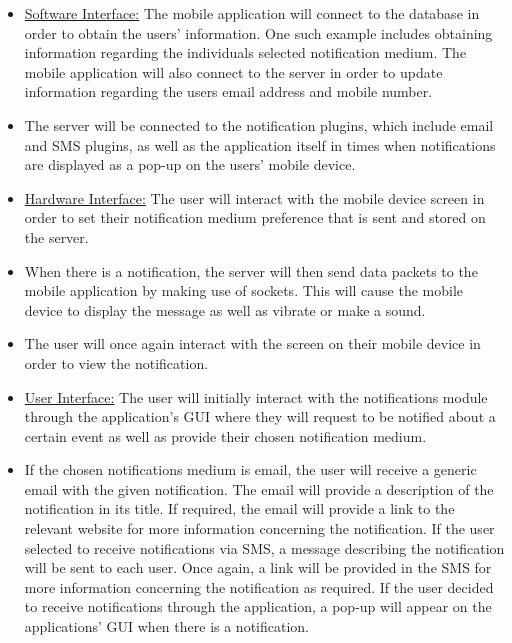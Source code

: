 \documentclass[runningheads,a4paper]{article}
\begin{document}
\begin{itemize}

\item \underline{Software Interface:}
The mobile application will connect to the database in order to obtain the users’ information. One such example includes obtaining information regarding the individuals selected notification medium. The mobile application will also connect to the server in order to update information regarding the users email address and mobile number.

\item The server will be connected to the notification plugins, which include email and SMS plugins, as well as the application itself in times when notifications are displayed as a pop-up on the users’ mobile device.

\item \underline{Hardware Interface:}
The user will interact with the mobile device screen in order to set their notification medium preference that is sent and stored on the server. 

\item When there is a notification, the server will then send data packets to the mobile application by making use of sockets. This will cause the mobile device to display the message as well as vibrate or make a sound. 

\item The user will once again interact with the screen on their mobile device in order to view the notification.

\item \underline{User Interface:}
The user will initially interact with the notifications module through the application’s GUI where they will request to be notified about a certain event as well as provide their chosen notification medium. 

\item If the chosen notifications medium is email, the user will receive a generic email with the given notification. The email will provide a description of the notification in its title. If required, the email will provide a link to the relevant website for more information concerning the notification. If the user selected to receive notifications via SMS, a message describing the notification will be sent to each user. Once again, a link will be provided in the SMS for more information concerning the notification as required. If the user decided to receive notifications through the application, a pop-up will appear on the applications’ GUI when there is a notification. 

\end{itemize}
\end{document}
